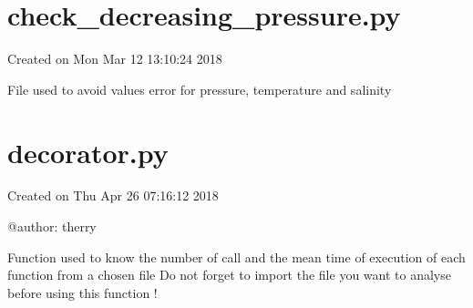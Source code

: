 \documentclass[letterpaper,10pt,english]{sphinxmanual}
\begin{document}
\section{check\_decreasing\_pressure.py}
\label{\detokenize{pargopy:module-pargopy.check_decreasing_pressure}}\label{\detokenize{pargopy:check-decreasing-pressure-py}}
Created on Mon Mar 12 13:10:24 2018

File used to avoid values error for pressure, temperature and salinity

\begin{fulllineitems}
\label{\detokenize{pargopy:pargopy.check_decreasing_pressure.check_pressure}}
\end{fulllineitems}


\begin{fulllineitems}
\label{\detokenize{pargopy:pargopy.check_decreasing_pressure.try_to_remove_duplicate_pressure}}
\end{fulllineitems}



\section{decorator.py}
\label{\detokenize{pargopy:module-pargopy.decorator}}\label{\detokenize{pargopy:decorator-py}}
Created on Thu Apr 26 07:16:12 2018

@author: therry

\begin{fulllineitems}
\label{\detokenize{pargopy:pargopy.decorator.call_results}}
Function used to know the number of call and the mean time of execution
of each function from a chosen file
Do not forget to import the file you want to analyse 
before using this function !

\end{fulllineitems}
\end{document}
